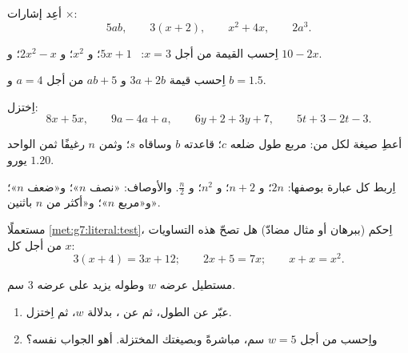 \begin{exercise}[$\star$]\label{exo:g7:literal:2}
أعِد إشارات $\times$:
\[
5ab, \qquad
3(x + 2), \qquad
x^2 + 4x, \qquad
2a^3 .
\]
\end{exercise}

\begin{exercise}[$\star$]\label{exo:g7:literal:3}
اِحسب القيمة من أجل $x = 3$: \ $5x + 1$؛ \quad و $x^2$؛ \quad و $2x^2 - x$؛
\quad و $10 - 2x$.
\end{exercise}

\begin{exercise}[$\star$]\label{exo:g7:literal:4}
اِحسب قيمة $3a + 2b$ و $a b + 5$ من أجل $a = 4$ و $b = 1.5$.
\end{exercise}

\begin{exercise}[$\star$]\label{exo:g7:literal:5}
اِختزل:
\[
8x + 5x, \qquad
9a - 4a + a, \qquad
6y + 2 + 3y + 7, \qquad
5t + 3 - 2t - 3 .
\]
\end{exercise}

\begin{exercise}[$\star$]\label{exo:g7:literal:6}
أعطِ صيغة لكل من:  مربع طول ضلعه $c$؛ 
 قاعدته $b$ وساقاه $s$؛
وثمن $n$ رغيفًا ثمن الواحد $1.20$ يورو.
\end{exercise}

\begin{exercise}[$\star$]\label{exo:g7:literal:7}
اِربط كل عبارة بوصفها: $2n$؛ و $n + 2$؛ و $n^2$؛
و $\frac n2$. والأوصاف: «نصف $n$»؛ و«ضعف $n$»؛
و«مربع $n$»؛ و«أكثر من $n$ باثنين».
\end{exercise}

\begin{exercise}[$\star\star$]\label{exo:g7:literal:8}
مستعملًا \cref{met:g7:literal:test}، اِحكم (ببرهان أو
مثال مضادّ) هل تصحّ هذه التساويات من أجل كل $x$:
\[
3(x + 4) = 3x + 12; \qquad
2x + 5 = 7x; \qquad
x + x = x^2 .
\]
\end{exercise}

\begin{exercise}[$\star\star$]\label{exo:g7:literal:9}
مستطيل عرضه $w$ وطوله يزيد على عرضه $3$
سم.
\begin{enumerate}
  \item عبّر عن الطول، ثم عن ، بدلالة $w$، ثم
        اِختزل.
  \item واِحسب  من أجل $w = 5$ سم، مباشرةً وبصيغتك
        المختزلة. أهو الجواب نفسه؟
\end{enumerate}
\end{exercise}

